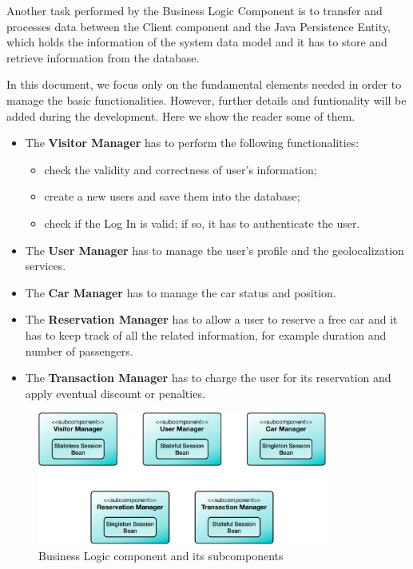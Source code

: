 Another task performed by the Business Logic Component is to transfer and processes data between the Client component and the Java Persistence Entity, which holds the information of the system data model and it has to store and retrieve information from the database.

In this document, we focus only on the fundamental elements needed in order to manage the basic functionalities. However, further details and funtionality will be added during the development. Here we show the reader some of them.

\begin{itemize}
\item The \textbf{Visitor Manager} has to perform the following functionalities:
	\begin{itemize}
	\item check the validity and correctness of user's information;
	\item create a new users and save them into the database;
	\item check if the Log In is valid; if so, it has to authenticate the user.
	\end{itemize}
\item The \textbf{User Manager} has to manage the user's profile and the geolocalization services.
\item The \textbf{Car Manager} has to manage the car status and position.
\item The \textbf{Reservation Manager} has to allow a user to reserve a free car and it has to keep track of all the related information, for example duration and number of passengers.
\item The \textbf{Transaction Manager} has to charge the user for its reservation and apply eventual discount or penalties.
\end{itemize}
\clearpage

\begin{figure}[htbp]
\centering
\vspace{104pt}
\includegraphics[width=0.85\textwidth]{Images/BusinessLogicComponent.pdf}
\vspace{10pt}
\caption{Business Logic component and its subcomponents}
\label{fig:business}
\end{figure}
\clearpage

